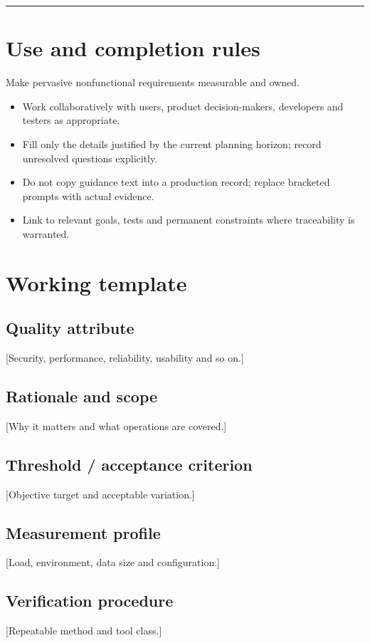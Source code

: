 \documentclass[11pt,letterpaper]{article}
\begin{document}
\tableofcontents\medskip\noindent\rule{\linewidth}{0.4pt}\medskip
\section{Use and completion rules}
Make pervasive nonfunctional requirements measurable and owned.

\begin{itemize}[leftmargin=*,itemsep=2pt]
\item Work collaboratively with users, product decision-makers, developers and testers as appropriate.
\item Fill only the details justified by the current planning horizon; record unresolved questions explicitly.
\item Do not copy guidance text into a production record; replace bracketed prompts with actual evidence.
\item Link to relevant goals, tests and permanent constraints where traceability is warranted.
\end{itemize}
\section{Working template}
\subsection{Quality attribute}
[Security, performance, reliability, usability and so on.]

\subsection{Rationale and scope}
[Why it matters and what operations are covered.]

\subsection{Threshold / acceptance criterion}
[Objective target and acceptable variation.]

\subsection{Measurement profile}
[Load, environment, data size and configuration.]

\subsection{Verification procedure}
[Repeatable method and tool class.]
\end{document}
